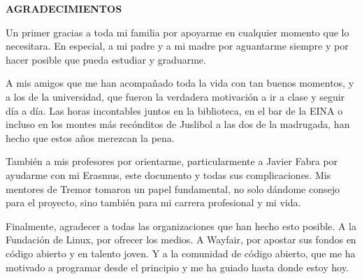 
\begin{center}
{\LARGE \bfseries AGRADECIMIENTOS}
\vspace{2.5cm}
\end{center}

Un primer gracias a toda mi familia por apoyarme en cualquier momento que lo
necesitara. En especial, a mi padre y a mi madre por aguantarme siempre y por
hacer posible que pueda estudiar y graduarme.

A mis amigos que me han acompañado toda la vida con tan buenos momentos, y a los
de la universidad, que fueron la verdadera motivación a ir a clase y seguir día
a día. Las horas incontables juntos en la biblioteca, en el bar de la EINA o
incluso en los montes más recónditos de Juslibol a las dos de la madrugada, han
hecho que estos años merezcan la pena.

También a mis profesores por orientarme, particularmente a Javier Fabra por
ayudarme con mi Erasmus, este documento y todas sus complicaciones. Mis mentores
de Tremor tomaron un papel fundamental, no solo dándome consejo para el
proyecto, sino también para mi carrera profesional y mi vida.

Finalmente, agradecer a todas las organizaciones que han hecho esto posible. A
la Fundación de Linux, por ofrecer los medios. A Wayfair, por apostar sus fondos
en código abierto y en talento joven. Y a la comunidad de código abierto, que me
ha motivado a programar desde el principio y me ha guiado hasta donde estoy hoy.
